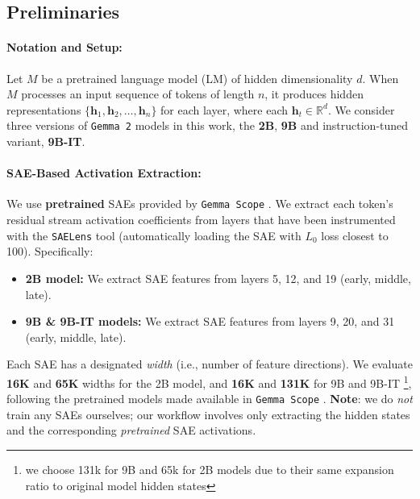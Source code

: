 \subsection{Preliminaries}

\paragraph{Notation and Setup:}
Let $M$ be a pretrained language model (LM) of hidden dimensionality $d$. When $M$ processes an input sequence of tokens of length $n$, it produces hidden representations $\{\mathbf{h}_1, \mathbf{h}_2, \ldots, \mathbf{h}_n\}$ for each layer, where each $\mathbf{h}_t \in \mathbb{R}^d$. We consider three versions of \texttt{Gemma 2} models \cite{gemmateam2024gemma2improvingopen} in this work, the \textbf{2B},  \textbf{9B} and instruction-tuned variant, \textbf{9B-IT}.

\paragraph{SAE-Based Activation Extraction:}
We use \textbf{pretrained} SAEs provided by \texttt{Gemma Scope} \cite{lieberum2024gemma}. We extract each token’s residual stream activation coefficients from layers that have been instrumented with the \texttt{SAELens} \cite{bloom2024saetrainingcodebase} tool  (automatically loading the SAE with $L_0$ loss closest to 100). Specifically:
\begin{itemize}
    \item \textbf{2B model:} We extract SAE features from layers 5, 12, and 19 (early, middle, late).
    \item \textbf{9B \& 9B-IT models:} We extract SAE features from layers 9, 20, and 31 (early, middle, late).
\end{itemize}
Each SAE has a designated \emph{width} (i.e., number of feature directions). We evaluate \textbf{16K} and \textbf{65K} widths for the 2B model, and \textbf{16K} and \textbf{131K} for 9B and 9B-IT \footnote{we choose 131k for 9B and 65k for 2B models due to their same expansion ratio to original model hidden states}, following the pretrained models made available in \texttt{Gemma Scope} \cite{lieberum2024gemma}. \textbf{Note}: we do \textit{not} train any SAEs ourselves; our workflow involves only extracting the hidden states and the corresponding \emph{pretrained} SAE activations.

